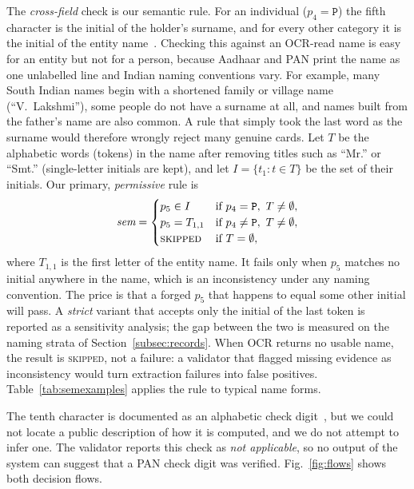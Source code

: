 \documentclass[12pt]{article}
\begin{document}
The \emph{cross-field} check is our semantic rule. For an individual
($p_4=\texttt{P}$) the fifth character is the initial of the holder's
surname, and for every other category it is the initial of the entity
name~\cite{itd-pan}. Checking this against an OCR-read name is easy for
an entity but not for a person, because Aadhaar and PAN print the name
as one unlabelled line and Indian naming conventions vary. For example, many South Indian names begin with a shortened family or village name (``V.~Lakshmi''), some people do not have a surname at all, and names built from the father's name are also common. A rule that simply took the last word as the surname would therefore wrongly reject many genuine cards. Let $T$ be the alphabetic words (tokens) in the name after removing titles such as ``Mr.'' or ``Smt.'' (single-letter initials are kept), and let $I = \{t_1 : t \in T\}$ be the set of their initials. Our primary,
\emph{permissive} rule is
\begin{equation}
\label{eq:sem}
\textit{sem} =
\begin{cases}
p_5 \in I        & \text{if } p_4=\texttt{P},\ T\neq\emptyset,\\
p_5 = T_{1,1}    & \text{if } p_4\neq\texttt{P},\ T\neq\emptyset,\\
\textsc{skipped} & \text{if } T=\emptyset,
\end{cases}
\end{equation}
where $T_{1,1}$ is the first letter of the entity name. It fails only
when $p_5$ matches no initial anywhere in the name, which is an
inconsistency under any naming convention. The price is that a forged
$p_5$ that happens to equal some other initial will pass. A
\emph{strict} variant that accepts only the initial of the last token is
reported as a sensitivity analysis; the gap between the two is measured
on the naming strata of Section~\ref{subsec:records}. When OCR returns
no usable name, the result is \textsc{skipped}, not a failure: a
validator that flagged missing evidence as inconsistency would turn
extraction failures into false positives.
Table~\ref{tab:semexamples} applies the rule to typical name forms.


The tenth character is documented as an alphabetic check
digit~\cite{itd-pan}, but we could not locate a public description of
how it is computed, and we do not attempt to infer one. The validator
reports this check as \emph{not applicable}, so no output of the system
can suggest that a PAN check digit was verified. Fig.~\ref{fig:flows}
shows both decision flows.
\end{document}
